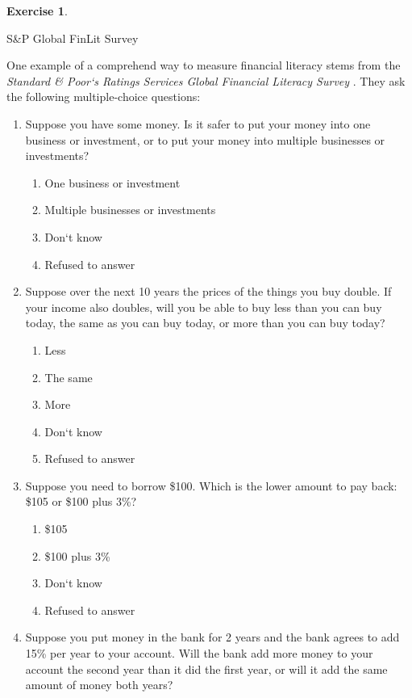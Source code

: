 \documentclass[
  12pt,
  oneside]{book}
\providecommand{\tightlist}{%
  \setlength{\itemsep}{0pt}\setlength{\parskip}{0pt}}
\theoremstyle{definition}
\theoremstyle{definition}
\theoremstyle{definition}
\newtheorem{exercise}{Exercise}[chapter]
\theoremstyle{definition}
\theoremstyle{remark}
\begin{document}
\begin{exercise}
\protect\hypertarget{exr:flmeasure}{}\label{exr:flmeasure}

S\&P Global FinLit Survey

One example of a comprehend way to measure financial literacy stems from the \emph{Standard \& Poor`s Ratings Services Global Financial Literacy Survey} \citep[see][]{Klapper2020Financial}. They ask the following multiple-choice questions:

\begin{enumerate}
\def\labelenumi{\arabic{enumi}.}
\tightlist
\item
  Suppose you have some money. Is it safer to put your money into one business or investment, or to put your money into multiple businesses or investments?

  \begin{enumerate}
  \def\labelenumii{\alph{enumii})}
  \tightlist
  \item
    One business or investment
  \item
    Multiple businesses or investments
  \item
    Don`t know
  \item
    Refused to answer
  \end{enumerate}
\item
  Suppose over the next 10 years the prices of the things you buy double. If your income also doubles, will you be able to buy less than you can buy today, the same as you can buy today, or more than you can buy today?

  \begin{enumerate}
  \def\labelenumii{\alph{enumii})}
  \tightlist
  \item
    Less
  \item
    The same
  \item
    More
  \item
    Don`t know
  \item
    Refused to answer
  \end{enumerate}
\item
  Suppose you need to borrow \$100. Which is the lower amount to pay back: \$105 or \$100 plus 3\%?

  \begin{enumerate}
  \def\labelenumii{\alph{enumii})}
  \tightlist
  \item
    \$105
  \item
    \$100 plus 3\%
  \item
    Don`t know
  \item
    Refused to answer
  \end{enumerate}
\item
  Suppose you put money in the bank for 2 years and the bank agrees to add 15\% per year to your account. Will the bank add more money to your account the second year than it did the first year, or will it add the same amount of money both years?


\end{enumerate}
\end{exercise}
\end{document}
